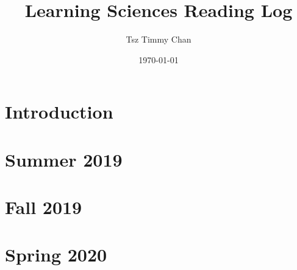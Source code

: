 \documentclass{LSRIarticle}
\title{Learning Sciences Reading Log}	%
\author{Tsz Timmy Chan}	%
\date{\today}
\affil{Learning Sciences Research Institute \\ University of Illinois at Chicago}
\begin{document}


\clearpage\maketitle
\thispagestyle{empty}

\section*{Introduction}

\newpage
\tableofcontents
\newpage
\listoffigures

\newpage

\setcounter{section}{-1}
\section{Summer 2019}
 

\newpage
\section{Fall 2019}



\newpage
\section{Spring 2020}

\printbibliography[heading=bibintoc]


\newpage
\printglossary[type=\acronymtype]
\printglossary
\end{document}
